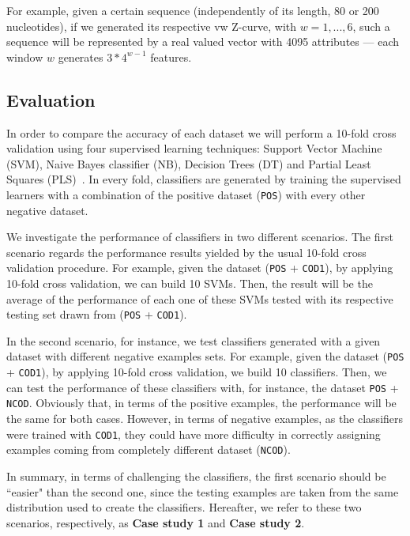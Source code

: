 \documentclass[runningheads,a4paper]{llncs}
\begin{document}
For example, given a certain sequence (independently of its length, 80 or 200 nucleotides), if we  generated its respective  vw Z-curve,  with $ w = 1, ..., 6 $, such a sequence will be represented by a real valued vector with 4095 attributes ---  each window $w$  generates $ 3*4^{w-1} $ features. 

\subsection{Evaluation}

In order to compare the accuracy of each dataset we will perform a 10-fold cross validation using four supervised learning techniques: Support Vector Machine (SVM), Naive Bayes classifier   (NB), Decision Trees (DT) and Partial Least Squares (PLS)~\cite{song2011,mitchell1997}. In every fold, classifiers are generated by training the supervised learners with a combination of the positive dataset ({\tt POS}) with every other negative dataset.

We  investigate the performance of classifiers in two different scenarios. The first scenario regards the performance results  yielded by the usual 10-fold cross validation procedure. For example, given the dataset ({\tt POS} + {\tt COD1}), by applying 10-fold cross validation, we can build  10 SVMs. Then, the result will be the average of the performance of each one of these SVMs tested with its respective testing set drawn from ({\tt POS} + {\tt COD1}).

In the second scenario, for instance, we test classifiers generated with a given dataset with  different negative examples sets.   For example, given the dataset ({\tt POS} + {\tt COD1}), by applying 10-fold cross validation, we build  10 classifiers. Then, we can test the performance of these classifiers with, for instance, the dataset {\tt POS} + {\tt NCOD}. Obviously that, in terms of the  positive examples, the performance will be the same for both cases. However, in terms of negative examples, as the classifiers  were trained with {\tt COD1}, they could have more difficulty in correctly assigning examples coming from completely different dataset ({\tt NCOD}).

In summary, in terms of challenging the classifiers, the first scenario should  be ``easier"  than the second one, since the testing examples are taken from the same distribution used to create the classifiers. Hereafter, we refer to these two scenarios, respectively,  as {\bf Case study 1} and {\bf Case study 2}.
\end{document}
